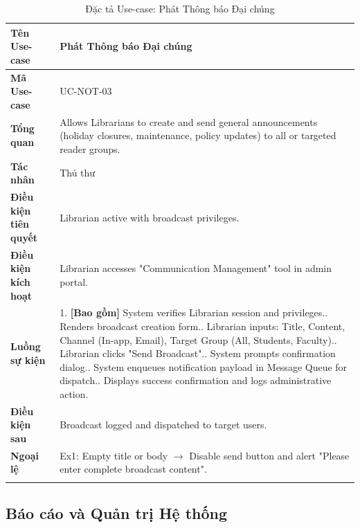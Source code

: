 \begin{longtable}{|p{3.5cm}|p{11.5cm}|}
    \hline
    \textbf{Tên Use-case} & \textbf{Phát Thông báo Đại chúng} \\
    \hline
    \textbf{Mã Use-case} & UC-NOT-03 \\
    \hline
    \textbf{Tổng quan} & Allows Librarians to create and send general announcements (holiday closures, maintenance, policy updates) to all or targeted reader groups. \\
    \hline
    \textbf{Tác nhân} & Thủ thư \\
    \hline
    \textbf{Điều kiện tiên quyết} & Librarian active with broadcast privileges. \\
    \hline
    \textbf{Điều kiện kích hoạt} & Librarian accesses "Communication Management" tool in admin portal. \\
    \hline
    \textbf{Luồng sự kiện} & 
    1. \textbf{[Bao gồm]} System verifies Librarian session and privileges.\newline
    2. Renders broadcast creation form.\newline
    3. Librarian inputs: Title, Content, Channel (In-app, Email), Target Group (All, Students, Faculty).\newline
    4. Librarian clicks "Send Broadcast".\newline
    5. System prompts confirmation dialog.\newline
    6. System enqueues notification payload in Message Queue for dispatch.\newline
    7. Displays success confirmation and logs administrative action. \\
    \hline
    \textbf{Điều kiện sau} & Broadcast logged and dispatched to target users. \\
    \hline
    \textbf{Ngoại lệ} & 
    Ex1: Empty title or body $\rightarrow$ Disable send button and alert "Please enter complete broadcast content". \\
    \hline
    \caption{Đặc tả Use-case: Phát Thông báo Đại chúng}
\end{longtable}

\subsection{Báo cáo và Quản trị Hệ thống}

